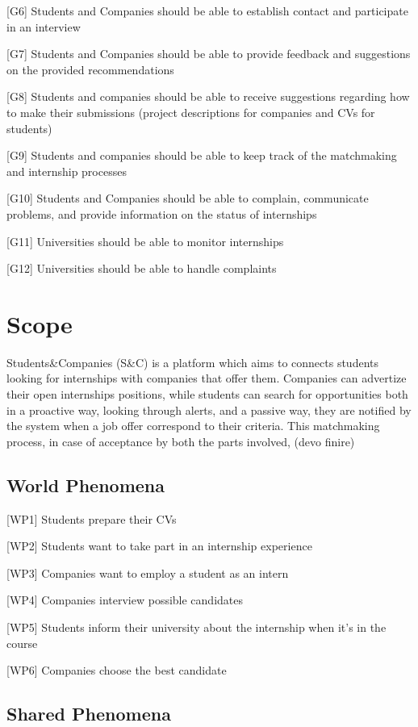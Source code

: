 [G6] Students and Companies should be able to establish contact and participate in an interview

[G7] Students and Companies should be able to provide feedback and suggestions on the provided recommendations

[G8] Students and companies should be able to receive suggestions regarding how to make their submissions (project descriptions for companies and CVs for students)

[G9] Students and companies should be able to keep track of the matchmaking and internship processes

[G10] Students and Companies should be able to complain, communicate problems, and provide information on the status of internships

[G11] Universities should be able to monitor internships

[G12] Universities should be able to handle complaints


\section{Scope}
Students&Companies (S&C) is a platform which aims to connects students looking for internships with companies that offer them. 
Companies can advertize their open internships positions, while students can search for opportunities both in a proactive way, looking through alerts, and a passive way, they are notified by the system when a job offer correspond to their criteria. 
This matchmaking process, in case of acceptance by both the parts involved,  (devo finire)

\subsection{World Phenomena}
[WP1] Students prepare their CVs

[WP2] Students want to take part in an internship experience 

[WP3] Companies want to employ a student as an intern 

[WP4] Companies interview possible candidates 

[WP5] Students inform their university about the internship when it's in the course

[WP6] Companies choose the best candidate

\subsection{Shared Phenomena}

